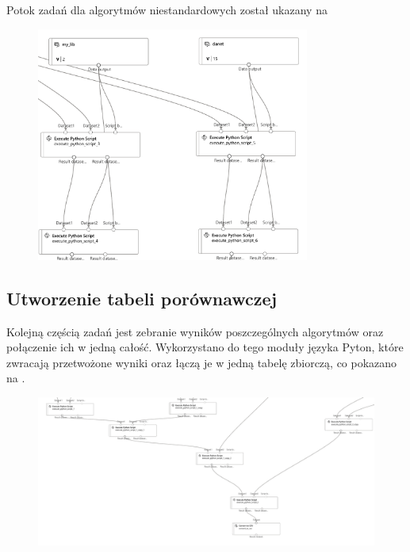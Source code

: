 Potok zadań dla algorytmów niestandardowych został ukazany na 

\begin{figure}[H]
    \centering
    \includegraphics[width=0.8\textwidth]{images/au-pipe}
    \label{fig:au-pipe}
\end{figure}


\subsection{Utworzenie tabeli porównawczej}
Kolejną częścią zadań jest zebranie wyników poszczególnych algorytmów oraz połączenie ich w jedną całość. Wykorzystano do tego moduły języka Pyton, które zwracają przetwożone wyniki oraz łączą je w jedną tabelę zbiorczą, co pokazano na .

\begin{figure}[H]
    \centering
    \includegraphics[width=\textwidth]{images/pipe-csv}
    \label{fig:pipe-4}
\end{figure}

